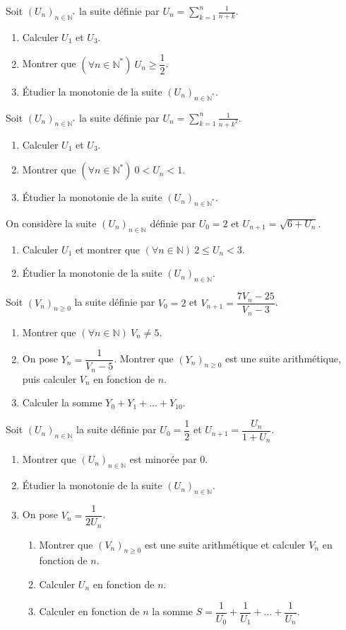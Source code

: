 Soit $(U_n)_{n\in\mathbb{N}^*}$ la suite définie par $U_n=\displaystyle\sum_{k=1}^{n}\frac{1}{n+k}$.
\begin{enumerate}
\item Calculer $U_1$ et $U_3$.
\item Montrer que $(\forall n\in\mathbb{N}^*)\ U_n\geq\dfrac12$.
\item Étudier la monotonie de la suite $(U_n)_{n\in\mathbb{N}^*}$.
\end{enumerate}
\fin
{}
Soit $(U_n)_{n\in\mathbb{N}^*}$ la suite définie par $U_n=\displaystyle\sum_{k=1}^{n}\frac{1}{n+k^2}$.
\begin{enumerate}
\item Calculer $U_1$ et $U_3$.
\item Montrer que $(\forall n\in\mathbb{N}^*)\ 0<U_n<1$.
\item Étudier la monotonie de la suite $(U_n)_{n\in\mathbb{N}^*}$.
\end{enumerate}
\fin
On considère la suite $(U_n)_{n\in\mathbb{N}}$ définie par $U_0=2$ et $U_{n+1}=\sqrt{6+U_n}$.
\begin{enumerate}
\item Calculer $U_1$ et montrer que $(\forall n\in\mathbb{N})\ 2\leq U_n<3$.
\item Étudier la monotonie de la suite $(U_n)_{n\in\mathbb{N}}$.
\end{enumerate}
\fin
{}
Soit $(V_n)_{n\geq0}$ la suite définie par $V_0=2$ et $V_{n+1}=\dfrac{7V_n-25}{V_n-3}$.
\begin{enumerate}
\item Montrer que $(\forall n\in\mathbb{N})\ V_n\neq5$.
\item On pose $Y_n=\dfrac{1}{V_n-5}$. Montrer que $(Y_n)_{n\geq0}$ est une suite arithmétique, puis calculer $V_n$ en fonction de $n$.
\item Calculer la somme $Y_0+Y_1+\dots+Y_{10}$.
\end{enumerate}
\fin
{}
Soit $(U_n)_{n\in\mathbb{N}}$ la suite définie par $U_0=\dfrac12$ et $U_{n+1}=\dfrac{U_n}{1+U_n}$.
\begin{enumerate}
\item Montrer que $(U_n)_{n\in\mathbb{N}}$ est minorée par $0$.
\item Étudier la monotonie de la suite $(U_n)_{n\in\mathbb{N}}$.
\item On pose $V_n=\dfrac{1}{2U_n}$.
\begin{enumerate}
\item Montrer que $(V_n)_{n\geq0}$ est une suite arithmétique et calculer $V_n$ en fonction de $n$.
\item Calculer $U_n$ en fonction de $n$.
\item Calculer en fonction de $n$ la somme $S=\dfrac{1}{U_0}+\dfrac{1}{U_1}+\dots+\dfrac{1}{U_n}$.
\end{enumerate}
\end{enumerate}
\fin
